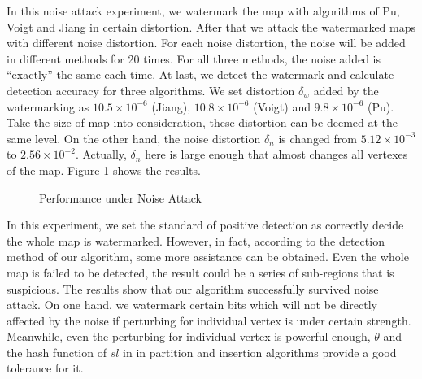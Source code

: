 In this noise attack experiment, we watermark the map with algorithms of Pu\cite{PuDJ06}, 
Voigt\cite{Voigt:2003} and Jiang in certain 
distortion. After that we attack the watermarked maps with different noise distortion. 
For each noise distortion, the noise will be added in different methods for 20 times. 
For all three methods, the noise added is ``exactly'' the same each time.
At last, we detect the watermark and calculate detection accuracy for three algorithms. 
We set distortion $\delta_w$ added by the watermarking as $10.5\times 10^{ -6 }$ (Jiang), 
$10.8\times 10^{-6}$ (Voigt) and $9.8\times 10^{-6}$ (Pu). Take the size of map into consideration,
these distortion can be deemed at the same level. On the other hand, the noise distortion 
$\delta_n$ is changed from $5.12 \times 10^{-3}$ to 
$2.56 \times 10^{-2}$. Actually, $\delta_n$ here is large enough that almost changes all 
vertexes of the map. Figure \ref{fig:noise} shows the results.
 


\begin{figure}[th]
\centering
{}
\caption{Performance under Noise Attack %
}
\label{fig:noise}
\end{figure}

In this experiment, we set the standard of positive detection as correctly
decide the whole map is watermarked. However, in fact, according to the 
detection method of our algorithm, some more assistance can be obtained.
Even the whole map is failed to be detected, the result could be a series
of sub-regions that is suspicious. 
The results show that our algorithm successfully survived noise 
attack. On one hand, we watermark certain bits which will not be directly affected by 
the noise if perturbing for individual vertex is under certain strength. 
Meanwhile, even the perturbing for individual vertex is powerful enough, 
$\theta $ and the hash function of $sl$ in in partition and insertion 
algorithms provide a good tolerance for it. 
   
